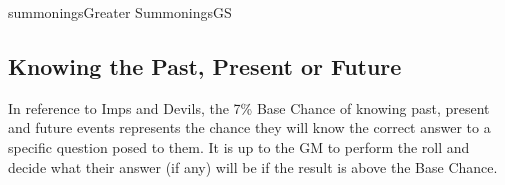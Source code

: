 \begin{College}[1.0]{summonings}{Greater Summonings}{GS}
\subsection{Knowing the Past, Present or Future}

In reference to Imps and Devils, the 7\% Base Chance of knowing past,
present and future events represents the chance they will know the
correct answer to a specific question posed to them.  It is up to the
GM to perform the roll and decide what their answer (if any) will be
if the result is above the Base Chance.

\end{College}
